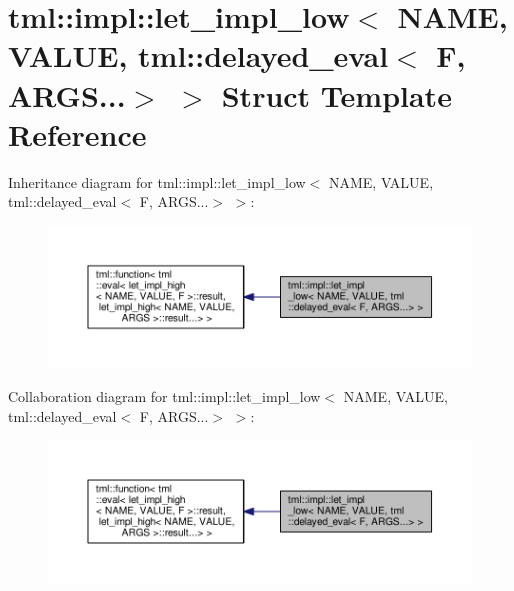 \hypertarget{structtml_1_1impl_1_1let__impl__low_3_01_n_a_m_e_00_01_v_a_l_u_e_00_01tml_1_1delayed__eval_3_01_f_00_01_a_r_g_s_8_8_8_4_01_4}{\section{tml\+:\+:impl\+:\+:let\+\_\+impl\+\_\+low$<$ N\+A\+M\+E, V\+A\+L\+U\+E, tml\+:\+:delayed\+\_\+eval$<$ F, A\+R\+G\+S...$>$ $>$ Struct Template Reference}
\label{structtml_1_1impl_1_1let__impl__low_3_01_n_a_m_e_00_01_v_a_l_u_e_00_01tml_1_1delayed__eval_3_01_f_00_01_a_r_g_s_8_8_8_4_01_4}
}


Inheritance diagram for tml\+:\+:impl\+:\+:let\+\_\+impl\+\_\+low$<$ N\+A\+M\+E, V\+A\+L\+U\+E, tml\+:\+:delayed\+\_\+eval$<$ F, A\+R\+G\+S...$>$ $>$\+:
\nopagebreak
\begin{figure}[H]
\begin{center}
\leavevmode
\includegraphics[width=350pt]{structtml_1_1impl_1_1let__impl__low_3_01_n_a_m_e_00_01_v_a_l_u_e_00_01tml_1_1delayed__eval_3_01_49834c4420c7f6e5d1ad3e09baa9134a}
\end{center}
\end{figure}


Collaboration diagram for tml\+:\+:impl\+:\+:let\+\_\+impl\+\_\+low$<$ N\+A\+M\+E, V\+A\+L\+U\+E, tml\+:\+:delayed\+\_\+eval$<$ F, A\+R\+G\+S...$>$ $>$\+:
\nopagebreak
\begin{figure}[H]
\begin{center}
\leavevmode
\includegraphics[width=350pt]{structtml_1_1impl_1_1let__impl__low_3_01_n_a_m_e_00_01_v_a_l_u_e_00_01tml_1_1delayed__eval_3_01_1cc178db6fb8e5e2a787a87a23791e45}
\end{center}
\end{figure}
